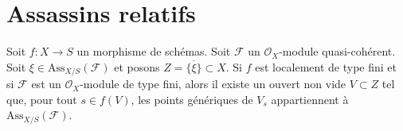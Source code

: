 \section{Assassins relatifs}
\label{section-assassin}

\begin{lemma}
\label{lemma-relative-assassin-in-neighbourhood}
Soit $f : X \to S$ un morphisme de schémas.
Soit $\mathcal{F}$ un $\mathcal{O}_X$-module quasi-cohérent.
Soit $\xi \in \text{Ass}_{X/S}(\mathcal{F})$ et posons
$Z = \overline{\{\xi\}} \subset X$.
Si $f$ est localement de type fini et si $\mathcal{F}$ est un
$\mathcal{O}_X$-module de type fini, alors il existe un ouvert non vide
$V \subset Z$ tel que, pour tout $s \in f(V)$, les points génériques
de $V_s$ appartiennent à $\text{Ass}_{X/S}(\mathcal{F})$.
\end{lemma}

